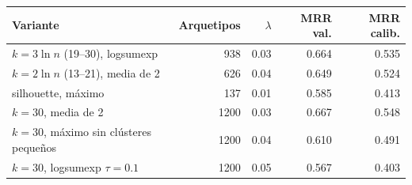 \begin{tabular}{lrrrr}
\toprule
Variante & Arquetipos & $\lambda$ & MRR val. & MRR calib. \\
\midrule
$k = 3\ln n$ (19--30), logsumexp & 938 & 0.03 & 0.664 & 0.535 \\
$k = 2\ln n$ (13--21), media de 2 & 626 & 0.04 & 0.649 & 0.524 \\
silhouette, máximo & 137 & 0.01 & 0.585 & 0.413 \\
$k=30$, media de 2 & 1200 & 0.03 & 0.667 & 0.548 \\
$k=30$, máximo sin clústeres pequeños & 1200 & 0.04 & 0.610 & 0.491 \\
$k=30$, logsumexp $\tau=0.1$ & 1200 & 0.05 & 0.567 & 0.403 \\
\bottomrule
\end{tabular}
